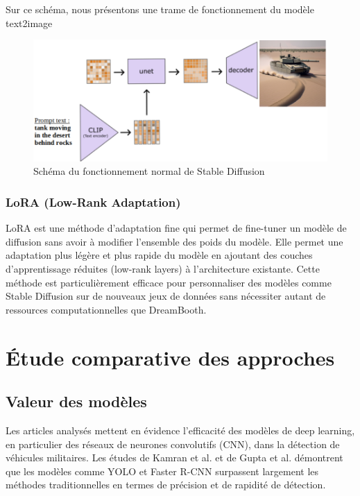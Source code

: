 Sur ce schéma, nous présentons une trame de fonctionnement du modèle text2image
\begin{figure}[H]
    \center
    \includegraphics[width=\textwidth]{./images/shema_sd.png}
    \caption{Schéma du fonctionnement normal de Stable Diffusion}
\end{figure}


\subsubsection{LoRA (Low-Rank Adaptation)}
LoRA est une méthode d'adaptation fine qui permet de fine-tuner un modèle de diffusion sans avoir à modifier l'ensemble des poids du modèle.
Elle permet une adaptation plus légère et plus rapide du modèle en ajoutant des couches d'apprentissage réduites (low-rank layers) à l'architecture existante.
Cette méthode est particulièrement efficace pour personnaliser des modèles comme Stable Diffusion sur de nouveaux jeux de données sans nécessiter autant de ressources computationnelles que DreamBooth.


\section{Étude comparative des approches}

\subsection{Valeur des modèles}

Les articles analysés mettent en évidence l'efficacité des modèles de deep learning, en particulier des réseaux de neurones convolutifs (CNN), dans la détection de véhicules militaires. Les études de Kamran et al. \cite{kamran2020} et de Gupta et al. \cite{gupta2021} démontrent que les modèles comme YOLO et Faster R-CNN surpassent largement les méthodes traditionnelles en termes de précision et de rapidité de détection.

